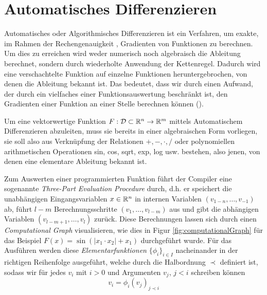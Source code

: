 \section{Automatisches Differenzieren}
Automatisches oder Algorithmisches Differenzieren ist ein Verfahren, um exakte, im Rahmen der Rechengenauigkeit \cite[S.51]{griewank2008evaluating}, Gradienten von Funktionen zu berechnen. Um dies zu erreichen wird weder numerisch noch algebraisch die Ableitung berechnet, sondern durch wiederholte Anwendung der Kettenregel. Dadurch wird eine verschachtelte Funktion auf einzelne Funktionen heruntergebrochen, von denen die Ableitung bekannt ist. Das bedeutet, dass wir durch einen Aufwand, der durch ein vielfaches einer Funktionsauswertung beschränkt ist, den Gradienten einer Funktion an einer Stelle berechnen können (\cite[S. 43, S.83]{griewank2008evaluating}). 

Um eine vektorwertige Funktion $F:\mathcal D \subset \mathbb{R}^n\to \mathbb{R}^m$ mittels Automatischem Differenzieren abzuleiten, muss sie bereits in einer algebraischen Form vorliegen, sie soll also aus Verknüpfung der Relationen $+, -, \cdot, /$ oder polynomiellen arithmetischen Operationen sin, cos, sqrt, exp, log usw. bestehen, also jenen, von denen eine elementare Ableitung bekannt ist.  

Zum Auswerten einer programmierten Funktion führt der Compiler eine sogenannte \textit{Three-Part Evaluation Procedure} durch, d.h. er speichert die unabhängigen Eingangsvariablen $x\in \mathbb{R}^n$ in internen Variablen $(v_{1-n},\ldots,v_{-1})$ ab, führt $l-m$ Berechnungsschritte $(v_1,\ldots, v_{l-m})$ aus und gibt die abhängigen Variablen $(v_{l-m+1},\ldots,v_l)$ zurück. Diese Berechnungen lassen sich durch einen \textit{Computational Graph} visualisieren, wie dies in Figur \ref{fig:computationalGraph} für das Beispiel $F(x) = \sin(|x_1\cdot x_2|+x_1)$ durchgeführt wurde. 
Für das Ausführen werden diese \textit{Elementarfunktionen} $\lbrace \phi_i \rbrace_{i\in I}$ nacheinander in der richtigen Reihenfolge ausgeführt, welche durch die Halbordnung $\prec$ definiert ist, sodass wir für jedes $v_i$ mit $i>0$ und Argumenten $v_j$, $j<i$ schreiben können
\[
 v_i = \phi_i(v_j)_{j\prec i}
\]

